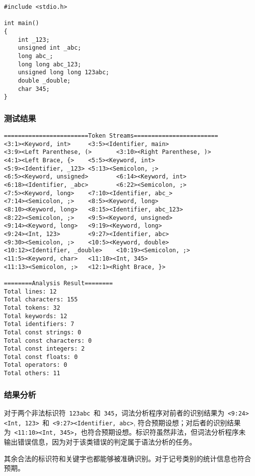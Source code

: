 \documentclass[lang=cn,11pt,a4paper]{paper}
\begin{document}
\begin{lstlisting}
#include <stdio.h>

int main()
{
    int _123;
    unsigned int _abc;
    long abc_;
    long long abc_123;
    unsigned long long 123abc;
    double _double;
    char 345;
}
\end{lstlisting}

\subsubsection{测试结果}

\begin{lstlisting}
========================Token Streams========================
<3:1><Keyword, int>     <3:5><Identifier, main>
<3:9><Left Parenthese, (>       <3:10><Right Parenthese, )>
<4:1><Left Brace, {>    <5:5><Keyword, int>
<5:9><Identifier, _123> <5:13><Semicolon, ;>
<6:5><Keyword, unsigned>        <6:14><Keyword, int>
<6:18><Identifier, _abc>        <6:22><Semicolon, ;>
<7:5><Keyword, long>    <7:10><Identifier, abc_>
<7:14><Semicolon, ;>    <8:5><Keyword, long>
<8:10><Keyword, long>   <8:15><Identifier, abc_123>
<8:22><Semicolon, ;>    <9:5><Keyword, unsigned>
<9:14><Keyword, long>   <9:19><Keyword, long>
<9:24><Int, 123>        <9:27><Identifier, abc>
<9:30><Semicolon, ;>    <10:5><Keyword, double>
<10:12><Identifier, _double>    <10:19><Semicolon, ;>
<11:5><Keyword, char>   <11:10><Int, 345>
<11:13><Semicolon, ;>   <12:1><Right Brace, }>

========Analysis Result========
Total lines: 12
Total characters: 155
Total tokens: 32
Total keywords: 12
Total identifiers: 7
Total const strings: 0
Total const characters: 0
Total const integers: 2
Total const floats: 0
Total operators: 0
Total others: 11
\end{lstlisting}

\subsubsection{结果分析}

对于两个非法标识符\ \lstinline{123abc}\ 和\ \lstinline{345}，词法分析程序对前者的识别结果为\ \lstinline{<9:24><Int, 123>}\ 和\ \lstinline{<9:27><Identifier, abc>}, 符合预期设想；对后者的识别结果为\ \lstinline{<11:10><Int, 345>}，也符合预期设想。标识符虽然非法，但词法分析程序未输出错误信息，因为对于该类错误的判定属于语法分析的任务。

其余合法的标识符和关键字也都能够被准确识别。对于记号类别的统计信息也符合预期。
\end{document}
